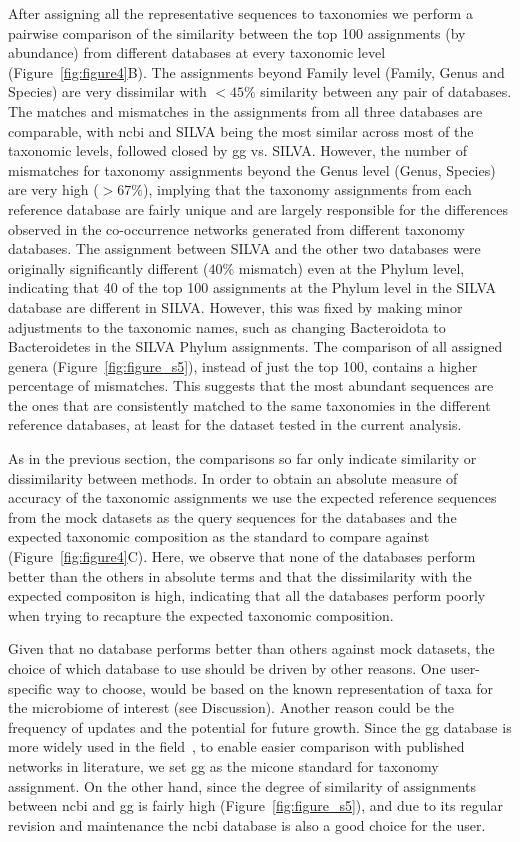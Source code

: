   After assigning all the representative sequences to taxonomies we perform a pairwise comparison of the similarity between the top 100 assignments (by abundance) from different databases at every taxonomic level (Figure~\ref{fig:figure4}B).
  The assignments beyond Family level (Family, Genus and Species) are very dissimilar with $<45\%$ similarity between any pair of databases.
  The matches and mismatches in the assignments from all three databases are comparable, with \ac{ncbi} and SILVA being the most similar across most of the taxonomic levels, followed closed by \ac{gg} vs. SILVA.
  However, the number of mismatches for taxonomy assignments beyond the Genus level (Genus, Species) are very high ($>67\%$), implying that the taxonomy assignments from each reference database are fairly unique and are largely responsible for the differences observed in the co-occurrence networks generated from different taxonomy databases.
  The assignment between SILVA and the other two databases were originally significantly different ($40\%$ mismatch) even at the Phylum level, indicating that 40 of the top 100 assignments at the Phylum level in the SILVA database are different in SILVA.
  However, this was fixed by making minor adjustments to the taxonomic names, such as changing Bacteroidota to Bacteroidetes in the SILVA Phylum assignments.
  The comparison of all assigned genera (Figure~\ref{fig:figure_s5}), instead of just the top 100, contains a higher percentage of mismatches.
  This suggests that the most abundant sequences are the ones that are consistently matched to the same taxonomies in the different reference databases, at least for the dataset tested in the current analysis.

  As in the previous section, the comparisons so far only indicate similarity or dissimilarity between methods.
  In order to obtain an absolute measure of accuracy of the taxonomic assignments we use the expected reference sequences from the mock datasets as the query sequences for the databases and the expected taxonomic composition as the standard to compare against (Figure~\ref{fig:figure4}C).
  Here, we observe that none of the databases perform better than the others in absolute terms and that the dissimilarity with the expected compositon is high, indicating that all the databases perform poorly when trying to recapture the expected taxonomic composition.

  Given that no database performs better than others against mock datasets, the choice of which database to use should be driven by other reasons.
  One user-specific way to choose, would be based on the known representation of taxa for the microbiome of interest (see Discussion). Another reason could be the frequency of updates and the potential for future growth.
  Since the \ac{gg} database is more widely used in the field~\cite{Balvociute2017}, to enable easier comparison with published networks in literature, we set \ac{gg} as the \ac{micone} standard for taxonomy assignment.
  On the other hand, since the degree of similarity of assignments between \ac{ncbi} and \ac{gg} is fairly high (Figure~\ref{fig:figure_s5}), and due to its regular revision and maintenance the \ac{ncbi} database is also a good choice for the user.

